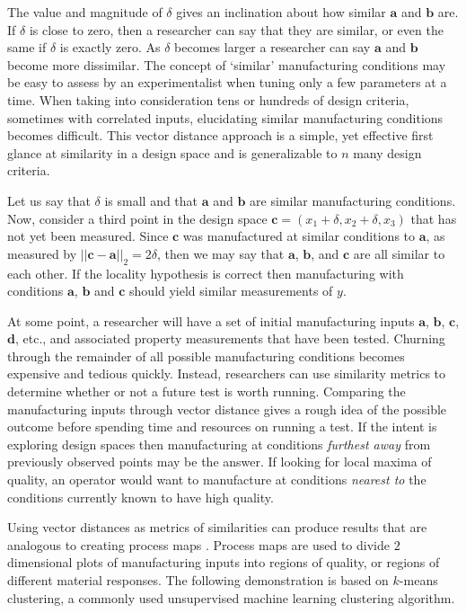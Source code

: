 The value and magnitude of $\delta$ gives an inclination about how similar $\mathbf{a}$ and $\mathbf{b}$ are.
If $\delta$ is close to zero, then a researcher can say that they are similar, or even the same if $\delta$ is exactly zero.
As $\delta$ becomes larger a researcher can say $\mathbf{a}$ and $\mathbf{b}$ become more dissimilar.
The concept of `similar' manufacturing conditions may be easy to assess by an experimentalist when tuning only a few parameters at a time.
When taking into consideration tens or hundreds of design criteria, sometimes with correlated inputs, elucidating similar manufacturing conditions becomes difficult.
This vector distance approach is a simple, yet effective first glance at similarity in a design space and is generalizable to $n$ many design criteria.

Let us say that $\delta$ is small and that $\mathbf{a}$ and $\mathbf{b}$ are similar manufacturing conditions.
Now, consider a third point in the design space $\mathbf{c} = (x_{1} + \delta, x_2 + \delta, x_3)$ that has not yet been measured.
Since $\mathbf{c}$ was manufactured at similar conditions to $\mathbf{a}$, as measured by $||\mathbf{c} - \mathbf{a}||_2 = 2\delta$, then we may say that $\mathbf{a}$, $\mathbf{b}$, and $\mathbf{c}$ are all similar to each other. If the locality hypothesis is correct then manufacturing with conditions $\mathbf{a}$, $\mathbf{b}$ and $\mathbf{c}$ should yield similar measurements of $y$.

At some point, a researcher will have a set of initial manufacturing inputs $\mathbf{a}$, $\mathbf{b}$, $\mathbf{c}$, $\mathbf{d}$, etc., and associated property measurements that have been tested.
Churning through the remainder of all possible manufacturing conditions becomes expensive and tedious quickly.
Instead, researchers can use similarity metrics to determine whether or not a future test is worth running.
Comparing the manufacturing inputs through vector distance gives a rough idea of the possible outcome before spending time and resources on running a test.
If the intent is exploring design spaces then manufacturing at conditions \textit{furthest away} from previously observed points may be the answer.
If looking for local maxima of quality, an operator would want to manufacture at conditions \textit{nearest to} the conditions currently known to have high quality.

Using vector distances as metrics of similarities can produce results that are analogous to creating process maps \cite{Beuth2001}.
Process maps are used to divide $2$ dimensional plots of manufacturing inputs into regions of quality, or regions of different material responses.
The following demonstration is based on $k$-means clustering, a commonly used unsupervised machine learning clustering algorithm.

